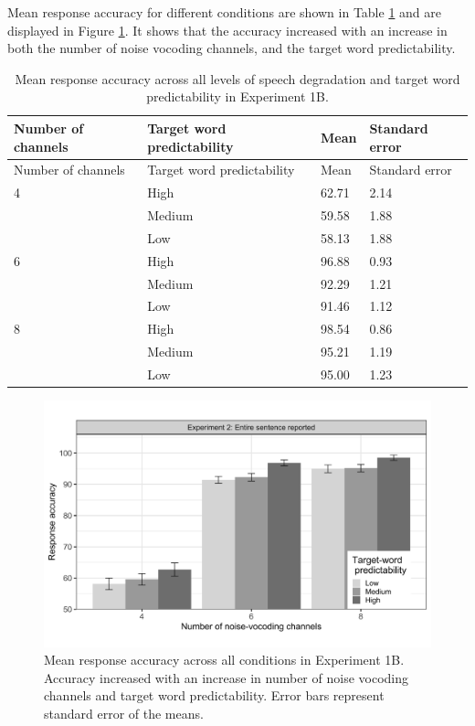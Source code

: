 \documentclass[a4paper, nobind]{templates/ociamthesis}
\begin{document}
Mean response accuracy for different conditions are shown in Table \ref{summary1b} and are displayed in Figure \ref{fig:figure1b}.
It shows that the accuracy increased with an increase in both the number of noise vocoding channels, and the target word predictability.

\begin{longtable}[]{@{}llll@{}}
\caption{Mean response accuracy across all levels of speech degradation
and target word predictability in Experiment 1B.}
\label{summary1b}
\tabularnewline
\toprule
Number of channels & Target word predictability & Mean & Standard
error \\
\midrule
\endfirsthead
\toprule
Number of channels & Target word predictability & Mean & Standard
error \\
\midrule
\endhead
4 & High & 62.71 & 2.14 \\
& Medium & 59.58 & 1.88 \\
& Low & 58.13 & 1.88 \\
6 & High & 96.88 & 0.93 \\
& Medium & 92.29 & 1.21 \\
& Low & 91.46 & 1.12 \\
8 & High & 98.54 & 0.86 \\
& Medium & 95.21 & 1.19 \\
& Low & 95.00 & 1.23 \\
\bottomrule
\end{longtable}

\begin{figure}

{\centering \includegraphics[width=0.95\linewidth]{figures/results-fig/expt-1b} 

}

\caption{Mean response accuracy across all conditions in Experiment 1B. Accuracy increased with an increase in number of noise vocoding channels and target word predictability. Error bars represent standard error of the means.}\label{fig:figure1b}
\end{figure}
\end{document}
